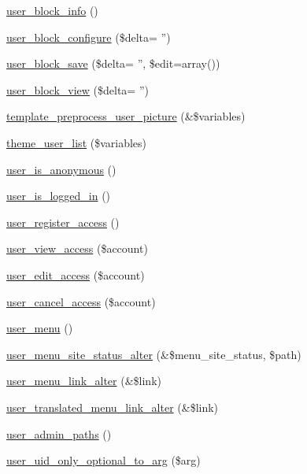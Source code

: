 \begin{DoxyCompactItemize}
\item 
\hyperlink{user_8module_ace25ccf18bbb198c6f2f3f60735f1b3d}{user\_\-block\_\-info} ()
\item 
\hyperlink{user_8module_a5494cdcda6f0d2930656ed704d9fbfa8}{user\_\-block\_\-configure} (\$delta= '')
\item 
\hyperlink{user_8module_adeeb8b22b27c97b3e3aff38487c03f4c}{user\_\-block\_\-save} (\$delta= '', \$edit=array())
\item 
\hyperlink{user_8module_ac06f7fc22561ebb4ad7130564bb7526e}{user\_\-block\_\-view} (\$delta= '')
\item 
\hyperlink{user_8module_aa1d7397dce93911938b4edbfee69ceb4}{template\_\-preprocess\_\-user\_\-picture} (\&\$variables)
\item 
\hyperlink{group__themeable_ga0c401997f59cbc4603fbd353e27eac2d}{theme\_\-user\_\-list} (\$variables)
\item 
\hyperlink{user_8module_af00464c62c20062112b8a25500719f69}{user\_\-is\_\-anonymous} ()
\item 
\hyperlink{user_8module_aafa6d7d07cbcb26b6728ee30122fb1b0}{user\_\-is\_\-logged\_\-in} ()
\item 
\hyperlink{user_8module_aeefc598398af2604fed325d4cb9f2577}{user\_\-register\_\-access} ()
\item 
\hyperlink{user_8module_a49c65cc4c7b0512c787fb8e822d7dd4d}{user\_\-view\_\-access} (\$account)
\item 
\hyperlink{user_8module_a9d988b07d458af21fe4e11868052b345}{user\_\-edit\_\-access} (\$account)
\item 
\hyperlink{user_8module_a1a179fa6a35c42c0c9234b7f67e3715f}{user\_\-cancel\_\-access} (\$account)
\item 
\hyperlink{user_8module_a48f90f1bf0f523df93ab31bd5b200573}{user\_\-menu} ()
\item 
\hyperlink{user_8module_ac2ced46ecfe66b365084a2b70acf2247}{user\_\-menu\_\-site\_\-status\_\-alter} (\&\$menu\_\-site\_\-status, \$path)
\item 
\hyperlink{user_8module_a2d32cfeed1c6c5f774ccd27c3e51308e}{user\_\-menu\_\-link\_\-alter} (\&\$link)
\item 
\hyperlink{user_8module_adfd500d7a85faa0058757c6b66fdabda}{user\_\-translated\_\-menu\_\-link\_\-alter} (\&\$link)
\item 
\hyperlink{user_8module_a9896eb1c67550e111cd5aa5198a1abc0}{user\_\-admin\_\-paths} ()
\item 
\hyperlink{user_8module_acafbef09764866dee15f8cf2b184aafc}{user\_\-uid\_\-only\_\-optional\_\-to\_\-arg} (\$arg)

\end{DoxyCompactItemize}

